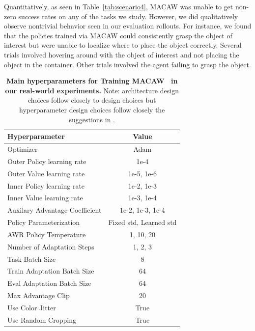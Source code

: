 \documentclass[../thesis.tex]{subfiles}
\begin{document}
{
Quantitatively, as seen in Table~\ref{tab:scenario4}, MACAW was unable to get non-zero success rates on any of the tasks we study. However, we did qualitatively observe nontrivial behavior seen in our evaluation rollouts. For instance, we found that the policies trained via MACAW could consistently grasp the object of interest but were unable to localize where to place the object correctly. Several trials involved hovering around with the object of interest and not placing the object in the container. Other trials involved the agent failing to grasp the object.
}

\begin{table}[h]
\centering
\begin{tabular}{l|c}
\toprule
\textbf{Hyperparameter} & \textbf{Value}\\  \midrule
Optimizer & Adam \\
Outer Policy learning rate & 1e-4 \\
Outer Value learning rate & 1e-5, 1e-6 \\
Inner Policy learning rate & 1e-2, 1e-3 \\
Inner Value learning rate & 1e-3, 1e-4 \\
Auxilary Advantage Coefficient & 1e-2, 1e-3, 1e-4 \\
Policy Parameterization & Fixed std, Learned std \\
AWR Policy Temperature & 1, 10, 20 \\
Number of Adaptation Steps & 1, 2, 3 \\
Task Batch Size & 8 \\
Train Adaptation Batch Size & 64 \\
Eval Adaptation Batch Size & 64 \\
Max Advantage Clip & 20 \\
Use Color Jitter & True \\
Use Random Cropping & True \\

\bottomrule
\end{tabular}
\vspace{0.07cm}
\caption{{\footnotesize{\textbf{Main hyperparameters for Training MACAW~\citep{2020arXiv200806043M} in our real-world experiments.} Note: architecture design choices follow closely to \ptrmethodname design choices but hyperparameter design choices follow closely the suggestions in \citet{2020arXiv200806043M}.}}}
\label{tab:hparams_macaw}
\vspace{-0.2cm}
\end{table}
\end{document}
